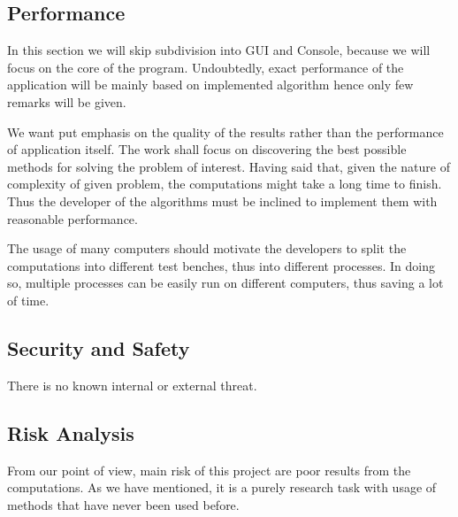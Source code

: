 \documentclass{article}
\begin{document}
%
%
\subsection{Performance}
In this section we will skip subdivision into GUI and Console, because we will focus on the core of the program. Undoubtedly, exact performance of the application will be mainly based on implemented algorithm hence only few remarks will be given.

We want put emphasis on the quality of the results rather than the performance of application itself. The work shall focus on discovering the best possible methods for solving the problem of interest. Having said that, given the nature of complexity of given problem, the computations might take a long time to finish. Thus the developer of the algorithms must be inclined to implement them with reasonable performance.

The usage of many computers should motivate the developers to split the computations into different test benches, thus into different processes. In doing so, multiple processes can be easily run on different computers, thus saving a lot of time. 



%
%
\subsection{Security and Safety}
There is no known internal or external threat.


\subsection{Risk Analysis}
From our point of view, main risk of this project are poor results from the computations. As we have mentioned, it is a purely research task with usage of methods that have never been used before. 
\end{document}
